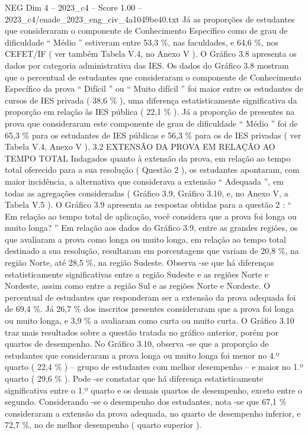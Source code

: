 \begin{textsample}{NEG Dim 4 – 2023\_c4 – Score 1.00 – 2023\_c4/enade\_2023\_eng\_civ\_4a1049be40.txt}
Já as proporções de estudantes que consideraram o componente de Conhecimento Específico como de grau de dificuldade “ Médio ” estiveram entre 53,3 \%, nas faculdades, e 64,6 \%, nos CEFET/IF ( ver também Tabela V.4, no Anexo V ).
O Gráfico 3.8 apresenta os dados por categoria administrativa das IES.
Os dados do Gráfico 3.8 mostram que o percentual de estudantes que consideraram o componente de Conhecimento Específico da prova “ Difícil ” ou “ Muito difícil ” foi maior entre os estudantes de cursos de IES privada ( 38,6 \% ), uma diferença estatisticamente significativa da proporção em relação às IES pública ( 22,1 \% ).
Já a proporção de presentes na prova que consideraram este componente de grau de dificuldade “ Médio ” foi de 65,3 \% para os estudantes de IES públicas e 56,3 \% para os de IES privadas ( ver Tabela V.4, Anexo V ). 3.2 EXTENSÃO DA PROVA EM RELAÇÃO AO TEMPO TOTAL Indagados quanto à extensão da prova, em relação ao tempo total oferecido para a sua resolução ( Questão 2 ), os estudantes apontaram, com maior incidência, a alternativa que considerava a extensão “ Adequada ”, em todas as agregações consideradas ( Gráfico 3.9, Gráfico 3.10, e, no Anexo V, a Tabela V.5 ).
O Gráfico 3.9 apresenta as respostas obtidas para a questão 2 : “ Em relação ao tempo total de aplicação, você considera que a prova foi longa ou muito longa? ” Em relação aos dados do Gráfico 3.9, entre as grandes regiões, os que avaliaram a prova como longa ou muito longa, em relação ao tempo total destinado a sua resolução, resultaram em porcentagens que variam de 20,8 \%, na região Norte, até 28,5 \%, na região Sudeste.
Observa -se que há diferenças estatisticamente significativas entre a região Sudeste e as regiões Norte e Nordeste, assim como entre a região Sul e as regiões Norte e Nordeste.
O percentual de estudantes que responderam ser a extensão da prova adequada foi de 69,4 \%.
Já 26,7 \% dos inscritos presentes consideraram que a prova foi longa ou muito longa, e 3,9 \% a avaliaram como curta ou muito curta.
O Gráfico 3.10 traz mais resultados sobre a questão tratada no gráfico anterior, porém por quartos de desempenho.
No Gráfico 3.10, observa -se que a proporção de estudantes que consideraram a prova longa ou muito longa foi menor no 4.º quarto ( 22,4 \% ) – grupo de estudantes com melhor desempenho – e maior no 1.º quarto ( 29,6 \% ).
Pode -se constatar que há diferença estatisticamente significativa entre o 1.º quarto e os demais quartos de desempenho, exceto entre o segundo.
Considerando -se o desempenho dos estudantes, nota -se que 67,1 \% consideraram a extensão da prova adequada, no quarto de desempenho inferior, e 72,7 \%, no de melhor desempenho ( quarto superior ).

\end{textsample}
